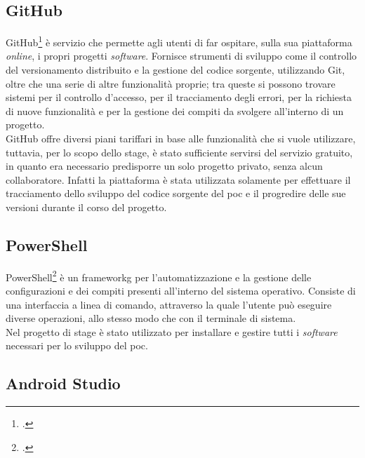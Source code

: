 \subsection*{GitHub}

GitHub\footcite{site:github} è servizio che permette agli utenti di far ospitare, sulla sua piattaforma \textit{online}, i propri progetti \textit{software}. Fornisce strumenti di sviluppo come il controllo del versionamento distribuito e la gestione del codice sorgente, utilizzando Git, oltre che una serie di altre funzionalità proprie; tra queste si possono trovare sistemi per il controllo d'accesso, per il tracciamento degli errori, per la richiesta di nuove funzionalità e per la gestione dei compiti da svolgere all'interno di un progetto.\\
GitHub offre diversi piani tariffari in base alle funzionalità che si vuole utilizzare, tuttavia, per lo scopo dello stage, è stato sufficiente servirsi del servizio gratuito, in quanto era necessario predisporre un solo progetto privato, senza alcun collaboratore. Infatti la piattaforma è stata utilizzata solamente per effettuare il tracciamento dello sviluppo del codice sorgente del \gls{poc} e il progredire delle sue versioni durante il corso del progetto.

\subsection*{PowerShell}

PowerShell\footcite{site:powershell} è un \gls{frameworkg}\glsfirstoccur{} per l'automatizzazione e la gestione delle configurazioni e dei compiti presenti all'interno del sistema operativo. Consiste di una interfaccia a linea di comando, attraverso la quale l'utente può eseguire diverse operazioni, allo stesso modo che con il terminale di sistema.\\
Nel progetto di stage è stato utilizzato per installare e gestire tutti i \textit{software} necessari per lo sviluppo del \gls{poc}.

\subsection*{Android Studio}

